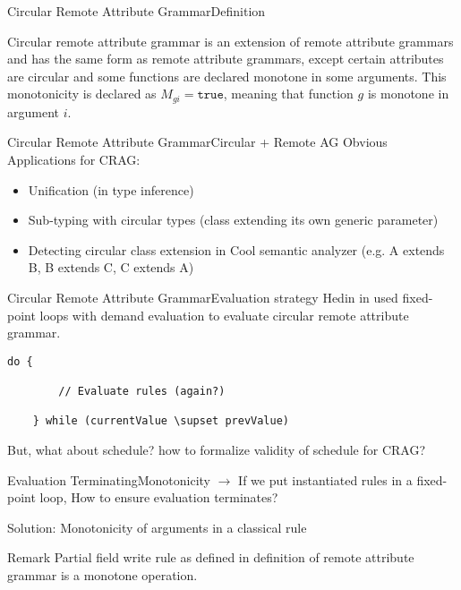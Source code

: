 \begin{frame}{Circular Remote Attribute Grammar}{Definition}

\begin{definition}
Circular remote attribute grammar is an \alert{extension of remote attribute grammars} and has the same form as remote attribute grammars, except \alert{certain attributes are circular} and \alert{some functions are declared monotone in some arguments}. This monotonicity is declared as $M_{gi} = \texttt{true}$, meaning that function $g$ is monotone in argument $i$.
\end{definition}
\end{frame}


\begin{frame}{Circular Remote Attribute Grammar}{Circular + Remote AG}
Obvious Applications for CRAG:

\begin{itemize}
    \item Unification (in type inference)
	\item Sub-typing with circular types (class extending its own generic parameter)
	\item Detecting circular class extension in Cool semantic analyzer (e.g. A extends B, B extends C, C extends A)
\end{itemize}
\end{frame}


\begin{frame}[fragile=singleslide]{Circular Remote Attribute Grammar}{Evaluation strategy}
Hedin in \cite{10.1016/j.scico.2005.06.005} used fixed-point loops with demand evaluation to evaluate circular remote attribute grammar.

\begin{Verbatim}[fontsize=\small]
    do {
    
        // Evaluate rules (again?)
        
    } while (currentValue \supset prevValue)
\end{Verbatim}

\newlinevspace

But, what about \alert{schedule}? how to formalize validity of schedule for CRAG?
\end{frame}


\begin{frame}{Evaluation Terminating}{Monotonicity}
$\to$ If we put instantiated rules in a fixed-point loop, How to \alert{ensure evaluation terminates}?

\newlinevspace

Solution: \alert{Monotonicity} of arguments in a classical rule

\begin{block}{Remark}
Partial field write rule as defined in definition of remote attribute grammar \alert{is a monotone operation}.
\end{block}
\end{frame}


